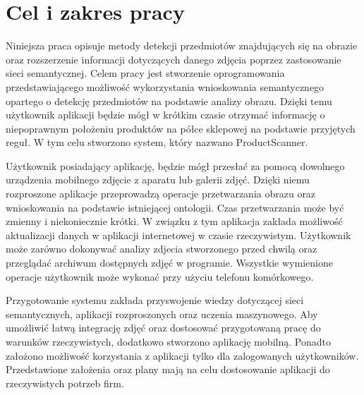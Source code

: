 \section{Cel i zakres pracy}
Niniejsza praca opisuje metody detekcji przedmiotów znajdujących się na obrazie oraz rozszerzenie informacji dotyczących danego zdjęcia poprzez zastosowanie sieci semantycznej. Celem pracy jest stworzenie oprogramowania przedstawiającego możliwość wykorzystania wnioskowania semantycznego opartego o detekcję przedmiotów na podstawie analizy obrazu. Dzięki temu użytkownik aplikacji będzie mógł w krótkim czasie otrzymać informację o niepoprawnym położeniu produktów na półce sklepowej na podstawie przyjętych reguł. W tym celu stworzono system, który nazwano ProductScanner.

Użytkownik posiadający aplikację, będzie mógł przesłać za pomocą dowolnego urządzenia mobilnego zdjęcie z aparatu lub galerii zdjęć. Dzięki niemu rozproszone aplikacje przeprowadzą operacje przetwarzania obrazu oraz wnioskowania na podstawie istniejącej ontologii. Czas przetwarzania może być zmienny i niekoniecznie krótki. W związku z tym aplikacja zakłada możliwość aktualizacji danych w aplikacji internetowej w czasie rzeczywistym. Użytkownik może zarówno dokonywać analizy zdjecia stworzonego przed chwilą oraz przeglądać archiwum dostępnych zdjęć w programie. Wszystkie wymienione operacje użytkownik może wykonać przy użyciu telefonu komórkowego.

Przygotowanie systemu zakłada przyswojenie wiedzy dotyczącej sieci semantycznych, aplikacji rozproszonych oraz uczenia maszynowego. Aby umożliwić łatwą integrację zdjęć oraz dostosować przygotowaną pracę do warunków rzeczywistych, dodatkowo stworzono aplikację mobilną. Ponadto założono możliwość korzystania z aplikacji tylko dla zalogowanych użytkowników. Przedstawione założenia oraz plany mają na celu dostosowanie aplikacji do rzeczywistych potrzeb firm.